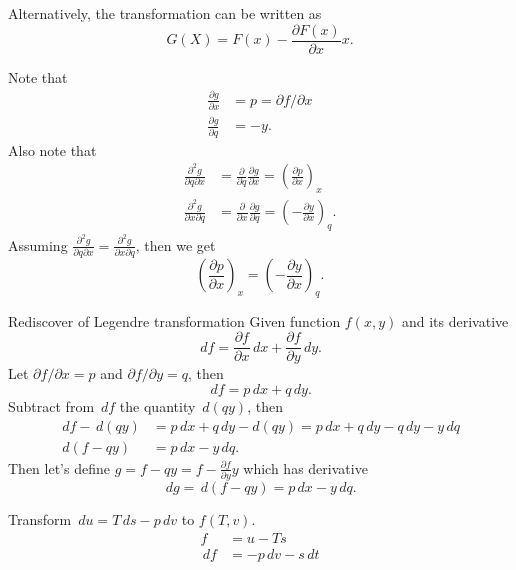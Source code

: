 \documentclass[11pt,a4paper,fleqn]{article}
\numberwithin{equation}{section}
\newcommand{\D}{\ensuremath{\,d}}
\begin{document}
Alternatively, the transformation can be written as
\begin{equation}
  G(X) = F(x) - \frac{\partial F(x)}{\partial x} x.
\end{equation}

Note that
\begin{align}
  \frac{\partial g}{\partial x} &= p =  \partial f / \partial x \\
  \frac{\partial g}{\partial q} &= -y.
\end{align}
Also note that
\begin{align}
  \frac{\partial^2 g}{\partial q\partial x} &= \frac{\partial}{\partial q} \frac{\partial g}{\partial x} = \left(\frac{\partial p}{\partial x}\right)_x \\
  \frac{\partial^2 g}{\partial x \partial q} &= \frac{\partial}{\partial x} \frac{\partial g}{\partial q}= \left(- \frac{\partial y}{\partial x}\right)_q.
\end{align}
Assuming $\frac{\partial^2 g}{\partial q\partial x} = \frac{\partial^2 g}{\partial x \partial q}$, then we get
\begin{equation}
  \left(\frac{\partial p}{\partial x}\right)_x =  \left(- \frac{\partial y}{\partial x}\right)_q.
\end{equation}
\begin{fact}{Rediscover of Legendre transformation}{}
  Given function $f(x,y)$ and its derivative
  \begin{equation}
    \D f=\frac{\partial f}{\partial x}\D x + \frac{\partial f}{\partial y}\D y.
  \end{equation}
  Let $\partial f / \partial x = p$ and $\partial f / \partial y = q$, then
  \begin{equation}
    \D f = p \D x + q \D y.
  \end{equation}
  Subtract from $\D f$ the quantity $\D (qy)$, then
  \begin{align}
    \D f - \D (qy) &= p \D x + q \D y - d(qy) = p \D x + q \D y - q \D y - y \D q \\
    \D (f-qy) &= p \D x - y \D q.
  \end{align}
  Then let's define $g = f-qy = f - \frac{\partial f}{\partial y} y$ which has derivative
  \begin{equation}
     \D g = \D (f-qy) = p \D x - y \D q.
  \end{equation}
\end{fact}

\begin{exec}
  Transform $\D u = T \D s  - p \D v$ to  $f(T,v)$.
  \tcblower
  \begin{align}
        f&=u-Ts\\
    \D f &= -p \D v - s \D t
  \end{align}
\end{exec}
\end{document}
